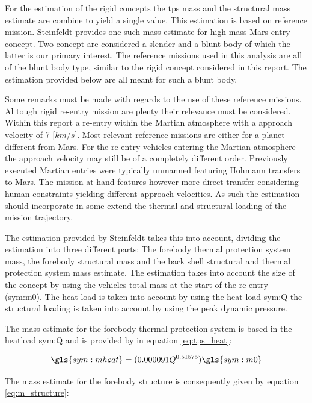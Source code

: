 For the estimation of the rigid concepts the \acrfull{tps} mass and the structural mass estimate are combine to yield a single value. This estimation is based on reference mission. Steinfeldt \cite{Steinfeldt2009} provides one such mass estimate for high mass Mars entry concept. Two concept are considered a slender and a blunt body of which the latter is our primary interest. The reference missions used in this analysis are all of the blunt body type, similar to the rigid concept considered in this report. The estimation provided below are all meant for such a blunt body.

Some remarks must be made with regards to the use of these reference missions. Al tough rigid re-entry mission are plenty their relevance must be considered. Within this report a re-entry within the Martian atmosphere with a approach velocity of 7 [$km/s$]. Most relevant reference missions are either for a planet different from Mars. For the re-entry vehicles entering the Martian atmosphere the approach velocity may still be of a completely different order. Previously executed Martian entries were typically unmanned featuring Hohmann transfers to Mars. The mission at hand features however more direct transfer considering human constraints yielding different approach velocities. As such the estimation should incorporate in some extend the thermal and structural loading of the mission trajectory.

The estimation provided by Steinfeldt takes this into account, dividing the estimation into three different parts: The forebody thermal protection system mass, the forebody structural mass and the back shell structural and thermal protection system mass estimate. The estimation takes into account the size of the concept by using the vehicles total mass at the start of the re-entry (\gls{sym:m0}). The heat load is taken into account by using the heat load \gls{sym:Q} the structural loading is taken into account by using the peak dynamic pressure.

The mass estimate for the forebody thermal protection system is based in the heatload \gls{sym:Q} and is provided by \cite{Laub2004} in equation \ref{eq:tps_heat}:

\begin{equation}
\gls{sym:mheat} = (0.000091Q^{0.51575})\gls{sym:m0}
\label{eq:tps_heat}
\end{equation}

The mass estimate for the forebody structure is consequently given by equation \ref{eq:m_structure}\cite{Steinfeldt2009}:


